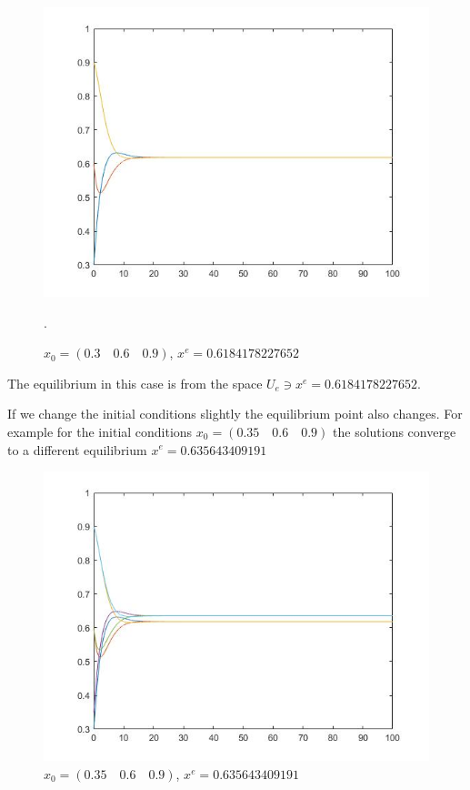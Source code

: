 \documentclass[a4paper,10pt, english]{article}
\begin{document}
\begin{figure}[ht]
\label{fig_c1}
\centering
\includegraphics[scale=0.4]{1.jpg}
\caption{$x_0 = (0.3 \quad0.6\quad 0.9)$, $x^e = 0.6184178227652$}.
\end{figure}

The equilibrium in this case is from the space $U_e\ni x^e = 0.6184178227652$.




\newpage
If we change the initial conditions slightly the equilibrium point also changes. For example for the initial conditions
$x_0 = (0.35\quad 0.6\quad 0.9)$ the solutions converge to a different  equilibrium $x^e = 0.635643409191$
\begin{figure}[ht]
\label{fig_c2}
\centering
\includegraphics[scale= 0.4]{2.jpg}

\caption{$x_0 = (0.35 \quad0.6\quad 0.9)$, $x^e = 0.635643409191$}
\end{figure}
\end{document}
